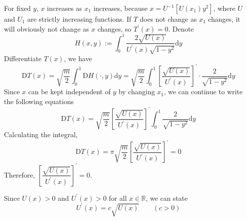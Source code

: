 \documentclass[12pt]{report}
\begin{document}
For fixed $y$, $x$ increases as $x_1$ increases, because $x=U^{-1}[U(x_1)y^2]$, where $U$ and $U_1$ are strictly increasing functions. If $T$ does not change as $x_1$ changes, it will obviously not change as $x$ changes, so $T^{'}(x)=0$. Denote
\begin{equation}
    H(x,y):=\int_0^1\dfrac{2\sqrt{U(x)}}{U^{'}(x)\sqrt{1-y^2}}\mathrm{d}y
\end{equation}
Differentiate $T(x)$, we have
\begin{equation}
    \mathrm{D}T(x)=\sqrt{\dfrac{m}{2}}\int_0^1\mathrm{D}H(\cdot,y)\mathrm{d}y=\sqrt{\dfrac{m}{2}}\int_0^1\left[\dfrac{\sqrt{U(x)}}{U^{'}(x)}\right]^{'}\cdot\dfrac{2}{\sqrt{1-y^2}}\mathrm{d}y
\end{equation}
Since $x$ can be kept independent of $y$ by changing $x_1$, we can continue to write the following equations
\begin{equation}
    \mathrm{D}T(x)=\sqrt{\dfrac{m}{2}}\left[\dfrac{\sqrt{U(x)}}{U^{'}(x)}\right]^{'}\int_0^1\dfrac{2}{\sqrt{1-y^2}}\mathrm{d}y
\end{equation}
Calculating the integral,
\begin{equation}
    \mathrm{D}T(x)=\pi\sqrt{\dfrac{m}{2}}\left[\dfrac{\sqrt{U(x)}}{U^{'}(x)}\right]^{'}=0
\end{equation}
Therefore, $\left[\dfrac{\sqrt{U(x)}}{U^{'}(x)}\right]^{'}=0$.

Since $U(x)>0$ and $U^{'}(x)>0$ for all $x\in\mathbb{R}$, we can state
\begin{equation}
    U^{'}(x)=c\sqrt{U(x)}\qquad(c>0)
\end{equation}
\end{document}
